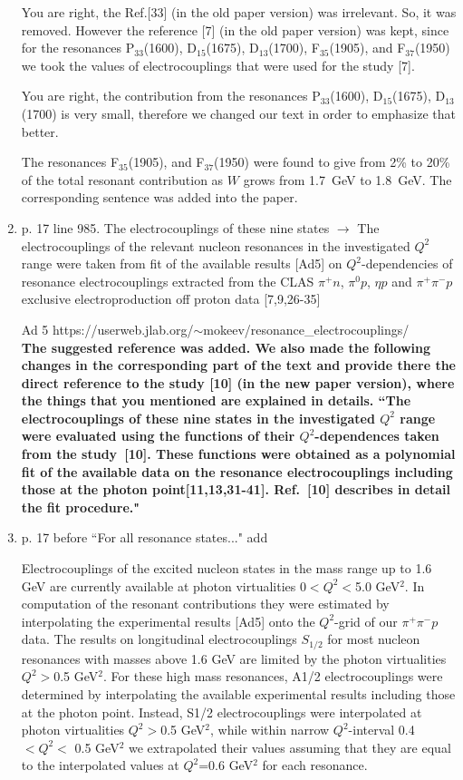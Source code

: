 \documentclass[,superscriptaddress,showpacs,amssymb,amsmath,amsfonts,linenumbers,article]{revtex4-1}
\begin{document}
\begin{enumerate}
{You are right, the Ref.[33] (in the old paper version) was irrelevant. So, it was removed. However the reference [7] (in the old paper version)  was kept, since  for the resonances  P$_{33}$(1600), D$_{15}$(1675), D$_{13}$(1700), F$_{35}$(1905), and F$_{37}$(1950) we took the values of electrocouplings that were used for the study [7].

You are right, the contribution from the resonances P$_{33}$(1600), D$_{15}$(1675), D$_{13}$(1700) is very small, therefore we changed our text in order to emphasize that better. 

The resonances F$_{35}$(1905), and F$_{37}$(1950) were found to give from 2\% to 20\% of the total resonant contribution as $W$ grows from 1.7~GeV to 1.8~GeV. The corresponding sentence was added into the paper.

}



\item  p. 17 line 985.  The electrocouplings of these nine states $\rightarrow$ The electrocouplings of the relevant nucleon resonances in the investigated $Q^2$ range were taken from fit of the available results [Ad5] on $Q^2$-dependencies of resonance electrocouplings extracted from the CLAS $\pi^+n$, $\pi^0p$, $\eta p$ and $\pi^+\pi^-p$ exclusive electroproduction off proton data [7,9,26-35]

Ad 5 https://userweb.jlab.org/$\sim$mokeev/resonance\_electrocouplings/\\[0.5cm]

{\bf The suggested reference was added. We also made the following changes in the corresponding part of the text and provide there the direct reference to the study [10] (in the new paper version), where the things that you mentioned are explained in details. ``The electrocouplings of these nine states in the investigated $Q^{2}$ range were evaluated using the functions of their $Q^{2}$-dependences taken from the study~[10]. These functions were obtained as a polynomial fit of the available data on the resonance electrocouplings including those at the photon point[11,13,31-41]. Ref.~[10] describes in detail the fit procedure." }

\item p. 17 before ``For all resonance states..." add

Electrocouplings of the excited nucleon states in the mass range up to 1.6 GeV are currently available at photon virtualities 0$<Q^2<$5.0 GeV$^2$. In computation of the resonant contributions they were estimated  by interpolating the experimental results [Ad5] onto the  $Q^2$-grid of our $\pi^+\pi^-p$ data. The results on longitudinal electrocouplings $S_{1/2}$ for most nucleon resonances with masses above 1.6 GeV are limited by the photon virtualities $Q^2>$0.5 GeV$^2$. For these high mass resonances, A1/2 electrocouplings were determined by interpolating the available experimental results including those at the photon point. Instead, S1/2 electrocouplings were interpolated at photon virtualities $Q^2>$0.5 GeV$^2$, while within narrow $Q^2$-interval 0.4 $<Q^2<$ 0.5 GeV$^2$ we extrapolated their values assuming that they are equal to the interpolated values at $Q^2$=0.6 GeV$^2$ for each resonance.



\end{enumerate}
\end{document}
